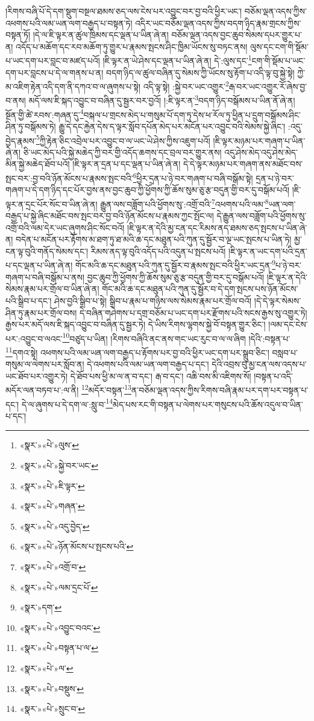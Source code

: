 །རིགས་བཞི་པོ་དེ་དག་སྡུག་བསྔལ་ཐམས་ཅད་ལས་ངེས་པར་འབྱུང་བར་བྱ་བའི་ཕྱིར་ཡང་། བཅོམ་ལྡན་འདས་ཀྱིས་འཕགས་པའི་ལམ་ཡན་ལག་བརྒྱད་པ་བསྟན་ཏེ། འདིར་ཡང་བཅོམ་ལྡན་འདས་ཀྱིས་བདག་ཉིད་རྣམ་གྲངས་ཀྱིས་བསྟན་ཏོ། །དེ་ལ་ཇི་ལྟར་ན་ཚུལ་ཁྲིམས་དང་ལྡན་པ་ཡིན་ཞེ་ན། བཅོམ་ལྡན་འདས་བྱང་ཆུབ་སེམས་དཔར་གྱུར་པ་ན། འདོད་པ་མཆོག་དང་རབ་མཆོག་ཏུ་གྱུར་པ་རྣམས་སྤངས་ཤིང་ཁྱིམ་ཡོངས་སུ་བཏང་ནས། ལུས་དང་ངག་གི་སྡོམ་པ་ཡང་དག་པར་བླང་བ་མཛད་པའོ། །ཇི་ལྟར་ན་ཡེ་ཤེས་དང་ལྡན་པ་ཡིན་ཞེ་ན། དེ་:ལུས་དང་\footnote{«སྣར་»«པེ་»ལུས་}ངག་གི་སྡོམ་པ་ཡང་དག་པར་བླངས་པ་དེ་ལ་གནས་པ་ན། བདག་ཉིད་ལ་ཚུལ་བཞིན་དུ་སེམས་ཀྱི་ཡོངས་སུ་རྟོག་པ་འདི་ལྟ་བུ་སྐྱེ་སྟེ། ཀྱེ་མ་འཇིག་རྟེན་འདི་དག་ནི་དཀའ་བ་ལ་ཞུགས་པ་སྟེ། འདི་ལྟ་སྟེ། :སྐྱེ་བར་ཡང་འགྱུར་\footnote{«སྣར་»«པེ་»སྐྱེ་བར་ཡང་}རྒ་བར་ཡང་འགྱུར་རོ་ཞེས་བྱ་བ་ནས། མདོ་ལས་ཇི་སྐད་འབྱུང་བ་བཞིན་དུ་སྦྱར་བར་བྱའོ། །:ཇི་ལྟར་ན་\footnote{«སྣར་»«པེ་»ཇི་ལྟར་}བདག་ཉིད་བསྒོམས་པ་ཡིན་ནོ་ཞེ་ན། སྔོན་གྱི་ཚེ་རབས་:གཞན་དུ་\footnote{«སྣར་»«པེ་»གཞན་}བསྐལ་པ་གྲངས་མེད་པ་གསུམ་པོ་དག་ཏུ་དེས་ཕ་རོལ་ཏུ་ཕྱིན་པ་དྲུག་བསྒོམས་ཤིང་ཤིན་ཏུ་བསྒོམས་ཏེ། རྒྱུ་དེ་དང་རྐྱེན་དེས་ད་ལྟར་སློབ་དཔོན་མེད་པར་མངོན་པར་འབྱུང་བའི་སེམས་སྐྱེ་ཞིང་། :འདུ་བྱེད་རྣམས་\footnote{«སྣར་»«པེ་»འདུ་བྱེད་}ཀྱི་རྟེན་ཅིང་འབྲེལ་པར་འབྱུང་བ་ལ་ཡང་ཡེ་ཤེས་ཀྱིས་འཇུག་པའོ། །ཇི་ལྟར་མཉམ་པར་གཞག་པ་ཡིན་ཞེ་ན། ཅི་ཡང་མེད་པའི་སྐྱེ་མཆེད་ཀྱི་བར་གྱི་འདོད་ཆགས་དང་བྲལ་བར་གྱུར་ནས། འདུ་ཤེས་མེད་འདུ་ཤེས་མེད་མིན་སྐྱེ་མཆེད་ཐོབ་པའོ། །ཇི་ལྟར་ན་དྲན་པ་དང་ལྡན་པ་ཡིན་ཞེ་ན། དེ་དེ་ལྟར་མཉམ་པར་གཞག་ནས་མཐོང་བས་སྤང་བར་:བྱ་བའི་ཉོན་མོངས་པ་རྣམས་སྤང་བའི་\footnote{«སྣར་»«པེ་»ཉོན་མོངས་པ་སྤངས་པའི་}ཕྱིར་དྲན་པ་ཉེ་བར་གཞག་པ་བཞི་བསྒོམ་སྟེ། དྲན་པ་ཉེ་བར་གཞག་པ་དེ་དག་ཉིད་དང་པོར་བྱས་ནས་བྱང་ཆུབ་ཀྱི་ཕྱོགས་ཀྱི་ཆོས་སུམ་ཅུ་རྩ་བདུན་གྱི་བར་དུ་བསྒོམ་པའོ། །ཇི་ལྟར་ན་དྲང་པོར་སོང་བ་ཡིན་ཞེ་ན། རྒྱུན་ལས་བཟློག་པའི་ཕྱོགས་སུ་:འགྲོ་བའི་\footnote{«སྣར་»«པེ་»འགྲོ་བ་}འཕགས་པའི་ལམ་\footnote{«སྣར་»«པེ་»ལམ་དྲང་པོ་}ཡན་ལག་བརྒྱད་པ་སྐྱེ་ཞིང་མཐོང་བས་སྤང་བར་བྱ་བའི་ཉོན་མོངས་པ་རྣམས་ཀྱང་སྤོང་ལ། དེ་རྒྱུན་ལས་བཟློག་པའི་ཕྱོགས་སུ་འགྲོ་བའི་ལམ་དེར་ཡང་ཞུགས་ཤིང་སོང་བའོ། །ཇི་ལྟར་ན་དེའི་མྱ་ངན་དང་རིམས་ནད་ཐམས་ཅད་སྤངས་པ་ཡིན་ཞེ་ན། བདེན་པ་མངོན་པར་རྟོགས་མ་ཐག་ཏུ་ཐ་མའི་ཆ་དང་མཐུན་པའི་ཀུན་དུ་སྦྱོར་བ་ལྔ་ཡང་སྤངས་པ་ཡིན་ཏེ། མྱ་ངན་ལྟ་བུའི་གནོད་སེམས་དང་། རིམས་ནད་ལྟ་བུའི་འདོད་པའི་འདུན་པ་སྤངས་པའོ། །ཇི་ལྟར་ན་ཡང་དག་པའི་དྲན་པ་དང་ལྡན་པ་ཡིན་ཞེ་ན། གོང་མའི་ཆ་དང་མཐུན་པའི་ཀུན་དུ་སྦྱོར་བ་རྣམས་སྤང་བའི་ཕྱིར་ཡང་དྲན་\footnote{«སྣར་»དག་}པ་ཉེ་བར་གཞག་པ་བཞི་བསྒོམ་པ་ནས། བྱང་ཆུབ་ཀྱི་ཕྱོགས་ཀྱི་ཆོས་སུམ་ཅུ་རྩ་བདུན་གྱི་བར་དུ་བསྒོམ་པའོ། །ཇི་ལྟར་ན་དེའི་སེམས་རྣམ་པར་གྲོལ་བ་ཡིན་ཞེ་ན། གོང་མའི་ཆ་དང་མཐུན་པའི་ཀུན་དུ་སྦྱོར་བ་དེ་དག་སྤངས་པས་ཉོན་མོངས་པའི་སྒྲིབ་པ་དང་། ཤེས་བྱའི་སྒྲིབ་པ་སྟེ། སྒྲིབ་པ་རྣམ་པ་གཉིས་ལས་སེམས་རྣམ་པར་གྲོལ་བའོ། །དེ་དེ་ལྟར་སེམས་ཤིན་ཏུ་རྣམ་པར་གྲོལ་བས། དེ་བཞིན་གཤེགས་པ་དགྲ་བཅོམ་པ་ཡང་དག་པར་རྫོགས་པའི་སངས་རྒྱས་སུ་འགྱུར་ཏེ། རྒྱས་པར་མདོ་ལས་ཇི་སྐད་འབྱུང་བ་བཞིན་དུ་སྦྱར་ཏེ། དེ་ཡིས་རིགས་ལྷགས་སྐྱེ་བོ་བསྟན་གྱུར་ཅིང་། །ལམ་དང་ངེས་པར་:འབྱུང་བ་ལའང་\footnote{«སྣར་»«པེ་»འབྱུང་བའང་}བཙུད་པ་ཡིན། །རིགས་བཞིའི་ནང་ནས་གང་ཡང་རུང་བ་ལ་ལ་ཞིག །དེའི་:བསྟན་པ་\footnote{«སྣར་»«པེ་»བསྟན་པ་ལ་}དགའ་སྟེ། འཕགས་པའི་ལམ་ཡན་ལག་བརྒྱད་པ་རྟོགས་པར་བྱ་བའི་ཕྱིར་ཡང་དག་པར་སྒྲུབ་ཅིང་། བསླབ་པ་གསུམ་ལ་ལེགས་པར་སློབ་ན། དེ་འཕགས་པའི་ལམ་ཡན་ལག་བརྒྱད་པ་དང་། དེའི་འབྲས་བུ་མྱ་ངན་ལས་འདས་པ་ཡང་ཐོབ་པར་འགྱུར་ཏེ། དེ་ཐོབ་པས་ཕྱི་མ་ལ་ན་བ་དང་། རྒ་བ་དང་། འཆི་བས་མི་འཇིགས་སོ། །བསྟན་པ་འདི་མདོར་ལན་བཏབ་པ་:ལ་ནི། \footnote{«སྣར་»«པེ་»ལ་}མདོར་བསྟན་\footnote{«སྣར་»«པེ་»བསྡུས་}ན་བཅོམ་ལྡན་འདས་ཀྱིས་རིགས་བཞི་རྣམ་པར་དག་པར་བསྟན་པ་དང་། དེ་ལ་ཞུགས་པ་དེ་དག་ལ་:སླུ་བ་\footnote{«སྣར་»«པེ་»སྲུང་བ་}མེད་པས་རང་གི་བསྟན་པ་ལེགས་པར་གསུངས་པའི་ཆོས་འདུལ་བ་ཡིན་པ་དང་། 